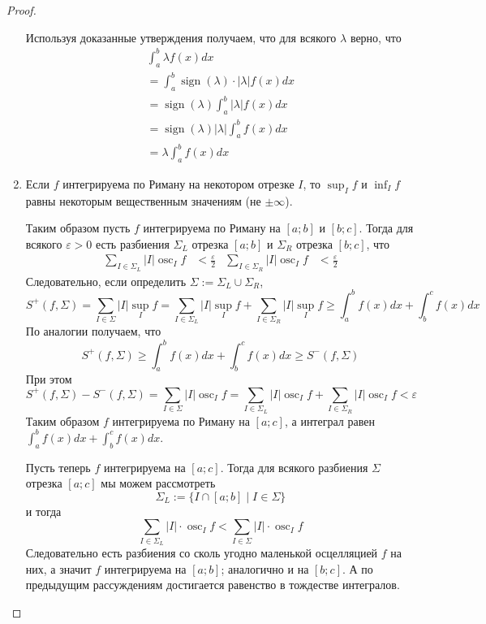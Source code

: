 \documentclass[12pt,a4paper]{article}
\DeclareMathOperator*{\osc}{osc}
\DeclareMathOperator{\sign}{sign}
\begin{document}
\begin{proof}
\begin{enumerate}
                Используя доказанные утверждения получаем, что для всякого $\lambda$ верно, что
                \begin{multline*}
                    \int_a^b \lambda f(x)dx\\
                    = \int_a^b \sign(\lambda)\cdot |\lambda| f(x)dx\\
                    = \sign(\lambda) \int_a^b |\lambda| f(x)dx\\
                    = \sign(\lambda)|\lambda| \int_a^b f(x)dx\\
                    = \lambda \int_a^b f(x)dx
                \end{multline*}

            \item Если $f$ интегрируема по Риману на некотором отрезке $I$, то $\sup_I f$ и $\inf_I f$ равны некоторым вещественным значениям (не $\pm\infty$).

                Таким образом пусть $f$ интегрируема по Риману на $[a; b]$ и $[b; c]$. Тогда для всякого $\varepsilon > 0$ есть разбиения $\Sigma_L$ отрезка $[a; b]$ и $\Sigma_R$ отрезка $[b; c]$, что
                \begin{align*}
                    \sum_{I \in \Sigma_L} |I| \osc_I f &< \frac{\varepsilon}{2}&
                    \sum_{I \in \Sigma_R} |I| \osc_I f &< \frac{\varepsilon}{2}
                \end{align*}
                Следовательно, если определить $\Sigma := \Sigma_L \cup \Sigma_R$,
                \[
                    S^+(f, \Sigma)
                    = \sum_{I \in \Sigma} |I| \sup_I f
                    = \sum_{I \in \Sigma_L} |I| \sup_I f + \sum_{I \in \Sigma_R} |I| \sup_I f
                    \geqslant \int_a^b f(x)dx + \int_b^c f(x)dx
                \]
                По аналогии получаем, что
                \[S^+(f, \Sigma) \geqslant \int_a^b f(x)dx + \int_b^c f(x)dx \geqslant S^-(f, \Sigma)\]
                При этом
                \[
                    S^+(f, \Sigma) - S^-(f, \Sigma)
                    = \sum_{I \in \Sigma} |I| \osc_I f
                    = \sum_{I \in \Sigma_L} |I| \osc_I f + \sum_{I \in \Sigma_R} |I| \osc_I f
                    < \varepsilon
                \]
                Таким образом $f$ интегрируема по Риману на $[a; c]$, а интеграл равен $\int_a^b f(x)dx + \int_b^c f(x)dx$.

                Пусть теперь $f$ интегрируема на $[a; c]$. Тогда для всякого разбиения $\Sigma$ отрезка $[a; c]$ мы можем рассмотреть
                \[\Sigma_L := \{I \cap [a; b] \mid I \in \Sigma\}\]
                и тогда
                \[\sum_{I \in \Sigma_L} |I| \cdot \osc_I f < \sum_{I \in \Sigma} |I| \cdot \osc_I f\]
                Следовательно есть разбиения со сколь угодно маленькой осцелляцией $f$ на них, а значит $f$ интегрируема на $[a; b]$; аналогично и на $[b; c]$. А по предыдущим рассуждениям достигается равенство в тождестве интегралов.
        \end{enumerate}
    \end{proof}
\end{document}
